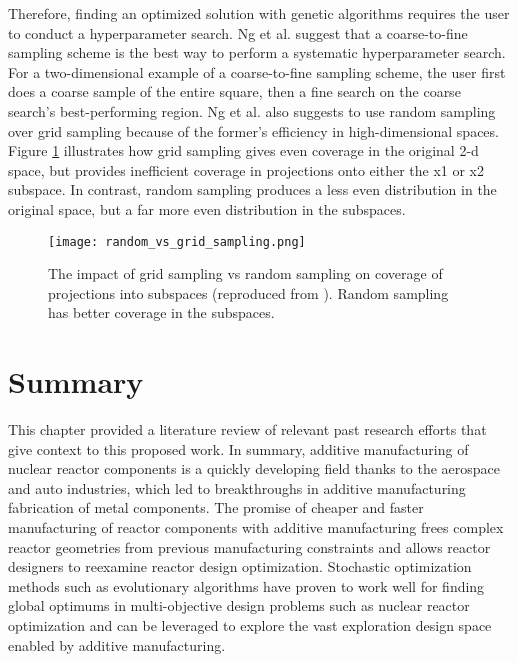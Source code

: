 Therefore, finding an optimized solution with genetic algorithms requires the user 
to conduct a hyperparameter search. 
Ng et al. \cite{ng_improving_2021} suggest that a coarse-to-fine sampling scheme 
is the best way to perform a systematic hyperparameter search.  
For a two-dimensional example of a coarse-to-fine sampling scheme, the user 
first does a coarse sample of the entire square, then a fine search on the 
coarse search's best-performing region. 
Ng et al. also suggests to use random sampling over grid sampling because of the 
former's efficiency in high-dimensional spaces. 
Figure \ref{fig:random_vs_grid_sampling} illustrates how grid sampling gives 
even coverage in the original 2-d space, but provides inefficient coverage in 
projections onto either the x1 or x2 subspace.  
In contrast, random sampling produces a less even distribution in the original 
space, but a far more even distribution in the subspaces.
\begin{figure}[]
    \centering
    \texttt{[image: random\_vs\_grid\_sampling.png]} 
    \caption{The impact of grid sampling vs random sampling on coverage of projections 
    into subspaces (reproduced from \cite{}). Random sampling has better coverage 
    in the subspaces.}
    \label{fig:random_vs_grid_sampling}
\end{figure}

\section{Summary}
This chapter provided a literature review of relevant past research 
efforts that give context to this proposed work.
In summary, additive manufacturing of nuclear reactor components is a quickly 
developing field thanks to the aerospace and auto industries, which led to 
breakthroughs in additive manufacturing fabrication of metal components. 
The promise of cheaper and faster manufacturing of reactor components with 
additive manufacturing frees complex reactor geometries from previous 
manufacturing constraints and allows reactor designers to reexamine reactor 
design optimization.  
Stochastic optimization methods such as evolutionary algorithms have proven to 
work well for finding global optimums in multi-objective design problems such as 
nuclear reactor optimization and can be leveraged to explore the vast exploration 
design space enabled by additive manufacturing.